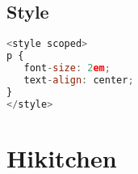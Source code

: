 \section{Style}



\begin{lstlisting}[language=JavaScript]
<style scoped>
p {
   font-size: 2em;
   text-align: center;
}
</style>
\end{lstlisting}


\chapter{Hikitchen}


\begin{lstlisting}[language=JavaScript]

\end{lstlisting}




\begin{lstlisting}[language=JavaScript]

\end{lstlisting}






\begin{lstlisting}[language=JavaScript]

\end{lstlisting}






\begin{lstlisting}[language=JavaScript]

\end{lstlisting}



\begin{lstlisting}[language=JavaScript]

\end{lstlisting}




\begin{lstlisting}[language=JavaScript]

\end{lstlisting}




\begin{lstlisting}[language=JavaScript]

\end{lstlisting}




